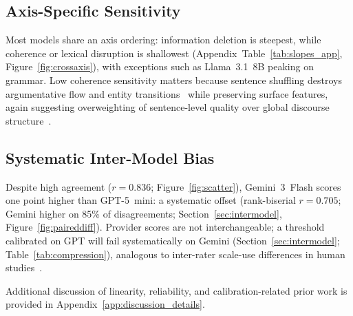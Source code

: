 \documentclass[11pt]{article}
\begin{document}
\subsection{Axis-Specific Sensitivity}

Most models share an axis ordering: information deletion is steepest,
while coherence or lexical disruption is shallowest
(Appendix~Table~\ref{tab:slopes_app}, Figure~\ref{fig:crossaxis}), with
exceptions such as Llama~3.1~8B peaking on grammar. Low coherence
sensitivity matters because sentence shuffling destroys argumentative
flow and entity transitions~\citep{barzilay2008modeling} while preserving
surface features, again suggesting overweighting of sentence-level
quality over global discourse structure~\citep{lapata2005automatic}.

\subsection{Systematic Inter-Model Bias}

Despite high agreement ($r=0.836$; Figure~\ref{fig:scatter}),
Gemini~3~Flash scores one point higher than GPT-5~mini: a systematic
offset (rank-biserial $r=0.705$; Gemini higher on 85\% of disagreements;
Section~\ref{sec:intermodel}, Figure~\ref{fig:paireddiff}). Provider
scores are not interchangeable; a threshold calibrated on GPT will fail
systematically on Gemini (Section~\ref{sec:intermodel};
Table~\ref{tab:compression}), analogous to inter-rater scale-use
differences in human studies~\citep{guilford1954psychometric}.

Additional discussion of linearity, reliability, and calibration-related prior work
is provided in Appendix~\ref{app:discussion_details}.
\end{document}
